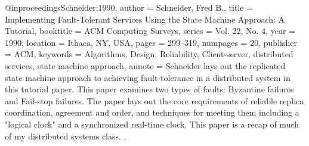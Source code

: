 \documentclass[english]{article}
\begin{document}
@inproceedings{Schneider:1990,
 author = {Schneider, Fred B.},
 title = {Implementing Fault-Tolerant Services Using the State Machine Approach: A Tutorial},
 booktitle = {ACM Computing Surveys},
 series = {Vol. 22, No. 4},
 year = {1990},
 location = {Ithaca, NY, USA},
 pages = {299--319},
 numpages = {20},
 publisher = {ACM},
 keywords = {Algorithms, Design, Reliability, Client-server, distributed services, state machine approach},
 annote = { Schneider lays out the replicated state machine approach to achieving fault-tolerance in a distributed system in this tutorial paper.  This paper examines two types of faults: Byzantine failures and Fail-stop failures. The paper lays out the core requirements of reliable replica coordination, agreement and order, and techniques for meeting them including a "logical clock" and a synchronized real-time clock. This paper is a recap of much of my distributed systems class. },
}
\end{document}
